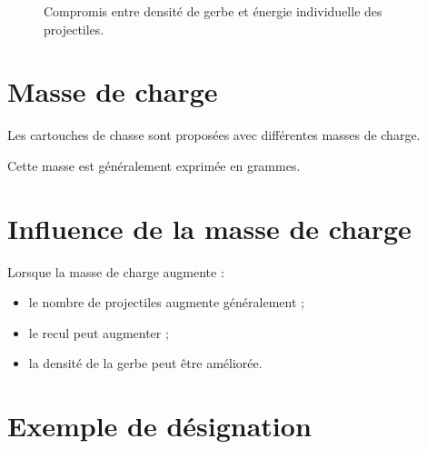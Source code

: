 \begin{figure}[htbp]
\centering


\caption{Compromis entre densité de gerbe et énergie individuelle des projectiles.}
\label{fig:compromis_grenaille}

\end{figure}

\section{Masse de charge}

Les cartouches de chasse sont proposées avec différentes masses de charge.

Cette masse est généralement exprimée en grammes.

\section{Influence de la masse de charge}

Lorsque la masse de charge augmente :

\begin{itemize}
    \item le nombre de projectiles augmente généralement ;
    \item le recul peut augmenter ;
    \item la densité de la gerbe peut être améliorée.
\end{itemize}

\section{Exemple de désignation}


